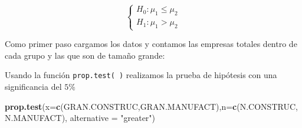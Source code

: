 \documentclass[letterpaper,]{book}
\newenvironment{Shaded}{\begin{snugshade}}{\end{snugshade}}
\newcommand{\DataTypeTok}[1]{\textcolor[rgb]{0.13,0.29,0.53}{#1}}
\newcommand{\KeywordTok}[1]{\textcolor[rgb]{0.13,0.29,0.53}{\textbf{#1}}}
\newcommand{\NormalTok}[1]{#1}
\newcommand{\OperatorTok}[1]{\textcolor[rgb]{0.81,0.36,0.00}{\textbf{#1}}}
\newcommand{\OtherTok}[1]{\textcolor[rgb]{0.56,0.35,0.01}{#1}}
\newcommand{\StringTok}[1]{\textcolor[rgb]{0.31,0.60,0.02}{#1}}
\begin{document}
\begin{equation} 
\begin{cases} 
H_0: \mu_1 \leq \mu_2 \\ 
H_1: \mu_1 > \mu_2
\end{cases} 
\end{equation}

Como primer paso cargamos los datos y contamos las empresas totales dentro de cada grupo y las que son de tamaño grande:

\begin{Shaded}
\end{Shaded}

Usando la función \texttt{prop.test(\ )} realizamos la prueba de hipótesis con una significancia del \(5\%\)

\begin{Shaded}
\begin{Highlighting}[]
\KeywordTok{prop.test}\NormalTok{(}\DataTypeTok{x=}\KeywordTok{c}\NormalTok{(GRAN.CONSTRUC,GRAN.MANUFACT),}\DataTypeTok{n=}\KeywordTok{c}\NormalTok{(N.CONSTRUC,N.MANUFACT), }
          \DataTypeTok{alternative =} \StringTok{"greater"}\NormalTok{)}
\end{Highlighting}
\end{Shaded}
\end{document}
